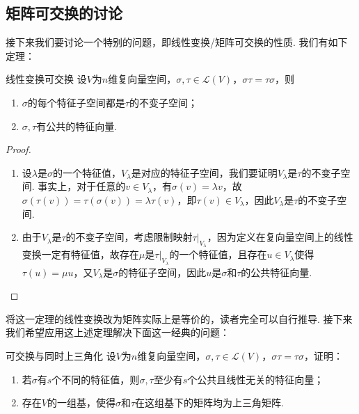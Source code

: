 \subsection{矩阵可交换的讨论}
接下来我们要讨论一个特别的问题，即线性变换/矩阵可交换的性质. 我们有如下定理：
\begin{theorem}{}{线性变换可交换}
    设$V$为$n$维复向量空间，$\sigma,\tau\in \mathcal{L}(V)$，$\sigma\tau=\tau\sigma$，则
    \begin{enumerate}
        \item $\sigma$的每个特征子空间都是$\tau$的不变子空间；

        \item $\sigma,\tau$有公共的特征向量.
    \end{enumerate}
\end{theorem}
\begin{proof}
    \begin{enumerate}
        \item 设$\lambda$是$\sigma$的一个特征值，$V_\lambda$是对应的特征子空间，我们要证明$V_\lambda$是$\tau$的不变子空间. 事实上，对于任意的$v\in V_\lambda$，有$\sigma(v)=\lambda v$，故$\sigma(\tau(v))=\tau(\sigma(v))=\lambda\tau(v)$，即$\tau(v)\in V_\lambda$，因此$V_\lambda$是$\tau$的不变子空间.

        \item 由于$V_\lambda$是$\tau$的不变子空间，考虑限制映射$\tau\vert_{V_\lambda}$，因为定义在复向量空间上的线性变换一定有特征值，故存在$\mu$是$\tau\vert_{V_\lambda}$的一个特征值，且存在$u\in V_\lambda$使得$\tau(u)=\mu u$，又$V_\lambda$是$\sigma$的特征子空间，因此$u$是$\sigma$和$\tau$的公共特征向量.
    \end{enumerate}
\end{proof}

将这一定理的线性变换改为矩阵实际上是等价的，读者完全可以自行推导. 接下来我们希望应用这上述定理解决下面这一经典的问题：
\begin{example}{}{可交换与同时上三角化}
    设$V$为$n$维复向量空间，$\sigma,\tau\in \mathcal{L}(V)$，$\sigma\tau=\tau\sigma$，证明：
    \begin{enumerate}
        \item 若$\sigma$有$s$个不同的特征值，则$\sigma,\tau$至少有$s$个公共且线性无关的特征向量；

        \item 存在$V$的一组基，使得$\sigma$和$\tau$在这组基下的矩阵均为上三角矩阵.
    \end{enumerate}
\end{example}


